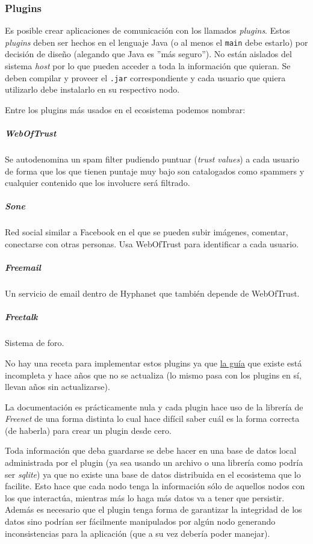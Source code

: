 \subsubsection{Plugins}

Es posible crear aplicaciones de comunicación con los llamados \textit{plugins}. Estos \textit{plugins} deben ser hechos en el lenguaje Java (o al menos el \texttt{main} debe estarlo) por decisión de diseño (alegando que Java es ''más seguro''). No están aislados del sistema \textit{host} por lo que pueden acceder a toda la información que quieran. Se deben compilar y proveer el \texttt{.jar} correspondiente y cada usuario que quiera utilizarlo debe instalarlo en su respectivo nodo.

Entre los plugins más usados en el ecosistema podemos nombrar:

\subparagraph{WebOfTrust}\cite{hyphanet-web-of-trust}
Se autodenomina un spam filter pudiendo puntuar (\textit{trust values}) a cada usuario de forma que los que tienen puntaje muy bajo son catalogados como spammers y cualquier contenido que los involucre será filtrado.

\subparagraph{Sone}\cite{hyphanter-sone}
Red social similar a Facebook en el que se pueden subir imágenes, comentar, conectarse con otras personas. Usa WebOfTrust para identificar a cada usuario.

\subparagraph{Freemail}\cite{hyphanet-freemail}
Un servicio de email dentro de Hyphanet que también depende de WebOfTrust.

\subparagraph{Freetalk}\cite{hyphanet-freetalk}
Sistema de foro.

No hay una receta para implementar estos plugins ya que \href{https://github.com/ArneBab/freenet-plugin-bare-guide/blob/master/index.org}{la guía} que existe está incompleta y hace años que no se actualiza (lo mismo pasa con los plugins en sí, llevan años sin actualizarse).

La documentación es prácticamente nula y cada plugin hace uso de la librería de \textit{Freenet} de una forma distinta lo cual hace difícil saber cuál es la forma correcta (de haberla) para crear un plugin desde cero.

Toda información que deba guardarse se debe hacer en una base de datos local administrada por el plugin (ya sea usando un archivo o una librería como podría ser \textit{sqlite}\cite{sqlite}) ya que no existe una base de datos distribuida en el ecosistema que lo facilite. Esto hace que cada nodo tenga la información sólo de aquellos nodos con los que interactúa, mientras más lo haga más datos va a tener que persistir. Además es necesario que el plugin tenga forma de garantizar la integridad de los datos sino podrían ser fácilmente manipulados por algún nodo generando inconsistencias para la aplicación (que a su vez debería poder manejar).

